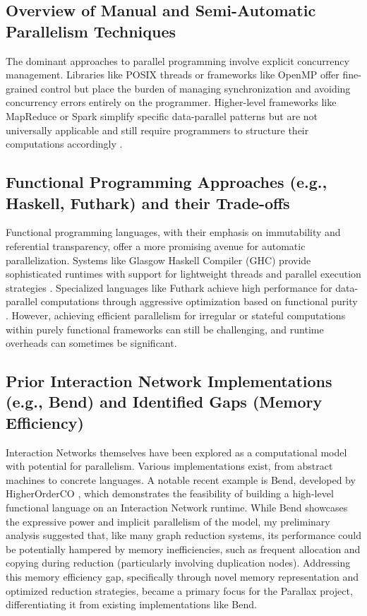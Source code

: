 \subsection{Overview of Manual and Semi-Automatic Parallelism Techniques}
The dominant approaches to parallel programming involve explicit concurrency management. Libraries like POSIX threads or frameworks like OpenMP offer fine-grained control but place the burden of managing synchronization and avoiding concurrency errors entirely on the programmer. Higher-level frameworks like MapReduce or Spark simplify specific data-parallel patterns but are not universally applicable and still require programmers to structure their computations accordingly \cite{McCool2012StructuredParallel}.

\subsection{Functional Programming Approaches (e.g., Haskell, Futhark) and their Trade-offs}
Functional programming languages, with their emphasis on immutability and referential transparency, offer a more promising avenue for automatic parallelization. Systems like Glasgow Haskell Compiler (GHC) provide sophisticated runtimes with support for lightweight threads and parallel execution strategies \cite{PeytonJones2003Haskell}. Specialized languages like Futhark achieve high performance for data-parallel computations through aggressive optimization based on functional purity \cite{Henriksen2017Futhark}. However, achieving efficient parallelism for irregular or stateful computations within purely functional frameworks can still be challenging, and runtime overheads can sometimes be significant.

\subsection{Prior Interaction Network Implementations (e.g., Bend) and Identified Gaps (Memory Efficiency)}
Interaction Networks themselves have been explored as a computational model with potential for parallelism. Various implementations exist, from abstract machines to concrete languages. A notable recent example is Bend, developed by HigherOrderCO \cite{BendGithub}, which demonstrates the feasibility of building a high-level functional language on an Interaction Network runtime. While Bend showcases the expressive power and implicit parallelism of the model, my preliminary analysis suggested that, like many graph reduction systems, its performance could be potentially hampered by memory inefficiencies, such as frequent allocation and copying during reduction (particularly involving duplication nodes). Addressing this memory efficiency gap, specifically through novel memory representation and optimized reduction strategies, became a primary focus for the Parallax project, differentiating it from existing implementations like Bend.


